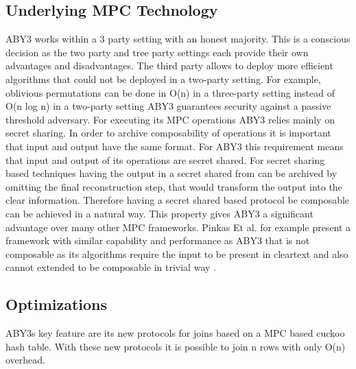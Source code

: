 \subsection{Underlying MPC Technology}
ABY3 works within a 3 party setting with an honest majority. This is a conscious decision as the two party and tree party settings each provide their own advantages and disadvantages.
The third party allows to deploy more efficient algorithms that could not be deployed in a two-party setting. For example, oblivious permutations can be done in O(n) in a three-party setting instead of O(n log n) in a two-party setting \cite{mohassel2020fast}
 ABY3 guarantees security against a passive threshold adversary. For executing its MPC operations ABY3 relies mainly on secret sharing. In order to archive composability of operations it is important that input and output have the same format. For ABY3 this requirement means that input and output of its operations are secret shared. For secret sharing based techniques having the output in a secret shared from can be archived by omitting the final  reconstruction step, that would transform the output into the clear information. Therefore having a secret shared based protocol be composable can be achieved in a natural way. This property gives ABY3 a significant advantage over many other MPC frameworks. Pinkas Et al. \cite{pinkas2014faster} for example present a framework with similar capability and performance as ABY3 that is not composable as its algorithms require the input to be present in cleartext and also cannot extended to be composable in trivial way \cite{mohassel2020fast}.      
  

\subsection{Optimizations}
ABY3s key feature are its new protocols for joins based on a MPC based cuckoo hash table. With these new protocols it is possible to join n rows with only O(n) overhead.
